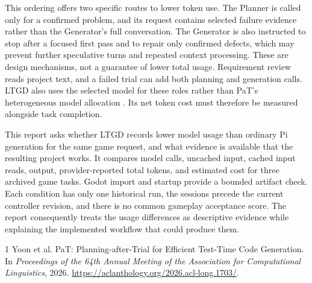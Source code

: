 \documentclass[11pt]{article}
\begin{document}
This ordering offers two specific routes to lower token use. The Planner is called only for a confirmed problem, and its request contains selected failure evidence rather than the Generator's full conversation. The Generator is also instructed to stop after a focused first pass and to repair only confirmed defects, which may prevent further speculative turns and repeated context processing. These are design mechanisms, not a guarantee of lower total usage. Requirement review reads project text, and a failed trial can add both planning and generation calls. LTGD also uses the selected model for these roles rather than PaT's heterogeneous model allocation \cite{yoon2026pat}. Its net token cost must therefore be measured alongside task completion.

This report asks whether LTGD records lower model usage than ordinary Pi generation for the same game request, and what evidence is available that the resulting project works. It compares model calls, uncached input, cached input reads, output, provider-reported total tokens, and estimated cost for three archived game tasks. Godot import and startup provide a bounded artifact check. Each condition has only one historical run, the sessions precede the current controller revision, and there is no common gameplay acceptance score. The report consequently treats the usage differences as descriptive evidence while explaining the implemented workflow that could produce them.

\begin{thebibliography}{1}
Yoon et al.
\newblock PaT: Planning-after-Trial for Efficient Test-Time Code Generation.
\newblock In \emph{Proceedings of the 64th Annual Meeting of the Association for Computational Linguistics}, 2026.
\newblock \url{https://aclanthology.org/2026.acl-long.1703/}.
\end{thebibliography}
\end{document}
